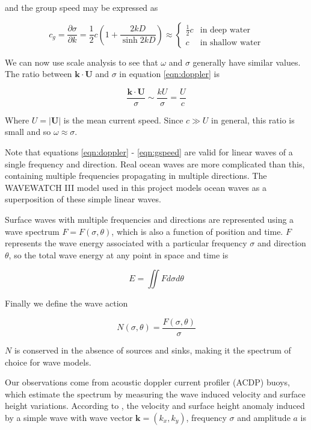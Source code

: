 and the group speed may be expressed as

\begin{equation}
c_g = \frac{\partial\sigma}{\partial k} = \frac{1}{2}c \left(1 + \frac{2kD}{\sinh{2kD}} \right) \approx \begin{cases}
    \frac{1}{2} c & \text{in deep water} \\
    c & \text{in shallow water}
\end{cases}
\label{eqn:gspeed}
\end{equation}

We can now use scale analysis to see that $\omega$ and $\sigma$ generally have similar values. The ratio between $\mathbf{k}\cdot\mathbf{U}$ and $\sigma$ in equation \ref{eqn:doppler} is

\[
\frac{\mathbf{k}\cdot\mathbf{U}}{\sigma} \sim \frac{kU}{\sigma} = \frac U c
\]

Where $U = |\mathbf{U}|$ is the mean current speed. Since $c \gg U$ in general, this ratio is small and so $\omega \approx \sigma$.

Note that equations \ref{eqn:doppler} - \ref{eqn:gspeed} are valid for linear waves of a single frequency and direction. Real ocean waves are more complicated than this, containing multiple frequencies propagating in multiple directions. The WAVEWATCH III model used in this project models ocean waves as a superposition of these simple linear waves.

Surface waves with multiple frequencies and directions are represented using a wave spectrum $F = F(\sigma,\theta)$, which is also a function of position and time. $F$ represents the wave energy associated with a particular frequency $\sigma$ and direction $\theta$, so the total wave energy at any point in space and time is 

\begin{equation}
E = \iint F d\sigma d\theta
\label{eqn:waveenergy}
\end{equation}

Finally we define the wave action

\[
N(\sigma,\theta) = \frac {F(\sigma,\theta)} {\sigma}
\]

$N$ is conserved in the absence of sources and sinks, making it the spectrum of choice for wave models.

Our observations come from acoustic doppler current profiler (ACDP) buoys, which estimate the spectrum by measuring the wave induced velocity and surface height variations. According to \cite{vallis_atmospheric_2017}, the velocity and surface height anomaly induced by a simple wave with wave vector $\mathbf{k} = \left(k_x,k_y\right)$, frequency $\sigma$ and amplitude $a$ is

